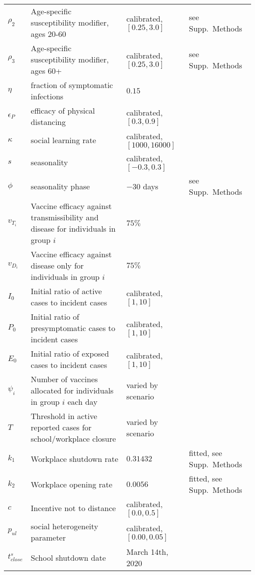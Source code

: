\documentclass[10pt,onecolumn,twoside,lineno]{pnas-new}
\begin{document}
\begin{table}[H]
\begin{tabular}{llll}
$\rho_2$ & Age-specific susceptibility modifier, ages 20-60 & calibrated, $[0.25,3.0]$  & see Supp.~Methods\\
$\rho_3$ & Age-specific susceptibility modifier, ages 60+ & calibrated, $[0.25,3.0]$  & see Supp.~Methods\\
$\eta$ & fraction of symptomatic infections & $0.15$ & \cite{mizumoto2020estimating} \\
$\epsilon_P$ & efficacy of physical distancing  & calibrated, $[0.3,0.9]$ & \cite{googlemobility, ontariocoviddata}  \\
$\kappa$    & social learning rate   & calibrated, $[1000,16000]$ & \cite{googlemobility, ontariocoviddata} \\
$ s $ & seasonality & calibrated, $[-0.3,0.3]$ & \cite{googlemobility, ontariocoviddata} \\
$\phi$  & seasonality phase & $-30$ days & see Supp.~Methods \\
$ v_{T_i} $ & Vaccine efficacy against transmissibility and disease for individuals in group $i$  &  $75 \%$  & \cite{WHO_TPP} \\
$ v_{D_i} $ & Vaccine efficacy against disease only for individuals in group $i$  &  $75 \%$  & \cite{WHO_TPP} \\
$ I_0 $ & Initial ratio of active cases to incident cases & calibrated, $[1,10]$ & \cite{googlemobility, ontariocoviddata} \\
$ P_0 $ & Initial ratio of presymptomatic cases to incident cases & calibrated, $[1,10]$ & \\
$ E_0 $ & Initial ratio of exposed cases to incident cases & calibrated, $[1,10]$ & \\
$\psi_i$ & Number of vaccines allocated for individuals in group $i$ each day & varied by scenario &  \\
$T$ & Threshold in active reported cases for school/workplace closure & varied by scenario  &  \\
$ k_1 $ & Workplace shutdown rate & $ 0.31432$ & fitted, see Supp.~Methods \\
$ k_2 $ & Workplace opening rate & $ 0.0056$ & fitted, see Supp.~Methods \\
$ c $ & Incentive not to distance & calibrated,$[0.0,0.5]$ & \cite{googlemobility, ontariocoviddata} \\
$ p_{ul} $ & social heterogeneity parameter & calibrated, $[0.00,0.05]$ & \cite{googlemobility, ontariocoviddata}  \\
$ t^s_{close} $ &  School shutdown date & March 14th, 2020 & \cite{school_closure}\\

\end{tabular}
\end{table}
\end{document}

